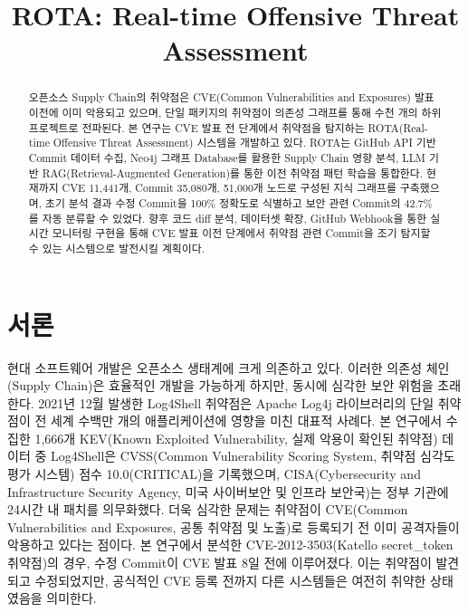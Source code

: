 ﻿\documentclass[conference]{IEEEtran}
\begin{document}
\sloppy
\setlength{\parskip}{0.3em}
\setlength{\parindent}{1em}

\renewcommand{\thesubsection}{\arabic{subsection}}

\title{ROTA: Real-time Offensive Threat Assessment}

\author{
}

\maketitle

\pagestyle{plain}
\thispagestyle{plain}

\begin{abstract}
오픈소스 Supply Chain의 취약점은 CVE(Common Vulnerabilities and Exposures) 발표 이전에 이미 악용되고 있으며, 단일 패키지의 취약점이 의존성 그래프를 통해 수천 개의 하위 프로젝트로 전파된다. 본 연구는 CVE 발표 전 단계에서 취약점을 탐지하는 ROTA(Real-time Offensive Threat Assessment) 시스템을 개발하고 있다. ROTA는 GitHub API 기반 Commit 데이터 수집, Neo4j 그래프 Database를 활용한 Supply Chain 영향 분석, LLM 기반 RAG(Retrieval-Augmented Generation)를 통한 이전 취약점 패턴 학습을 통합한다. 현재까지 CVE 11,441개, Commit 35,080개, 51,000개 노드로 구성된 지식 그래프를 구축했으며, 초기 분석 결과 수정 Commit을 100\% 정확도로 식별하고 보안 관련 Commit의 42.7\%를 자동 분류할 수 있었다. 향후 코드 diff 분석, 데이터셋 확장, GitHub Webhook을 통한 실시간 모니터링 구현을 통해 CVE 발표 이전 단계에서 취약점 관련 Commit을 조기 탐지할 수 있는 시스템으로 발전시킬 계획이다.
\end{abstract}

\section{서론}

\indent 현대 소프트웨어 개발은 오픈소스 생태계에 크게 의존하고 있다. 이러한 의존성 체인(Supply Chain)은 효율적인 개발을 가능하게 하지만, 동시에 심각한 보안 위험을 초래한다. 2021년 12월 발생한 Log4Shell 취약점은 Apache Log4j 라이브러리의 단일 취약점이 전 세계 수백만 개의 애플리케이션에 영향을 미친 대표적 사례다. 본 연구에서 수집한 1,666개 KEV(Known Exploited Vulnerability, 실제 악용이 확인된 취약점) 데이터 중 Log4Shell은 CVSS(Common Vulnerability Scoring System, 취약점 심각도 평가 시스템) 점수 10.0(CRITICAL)을 기록했으며, CISA(Cybersecurity and Infrastructure Security Agency, 미국 사이버보안 및 인프라 보안국)는 정부 기관에 24시간 내 패치를 의무화했다. 더욱 심각한 문제는 취약점이 CVE(Common Vulnerabilities and Exposures, 공통 취약점 및 노출)로 등록되기 전 이미 공격자들이 악용하고 있다는 점이다. 본 연구에서 분석한 CVE-2012-3503(Katello secret\_token 취약점)의 경우, 수정 Commit이 CVE 발표 8일 전에 이루어졌다. 이는 취약점이 발견되고 수정되었지만, 공식적인 CVE 등록 전까지 다른 시스템들은 여전히 취약한 상태였음을 의미한다.
\end{document}

